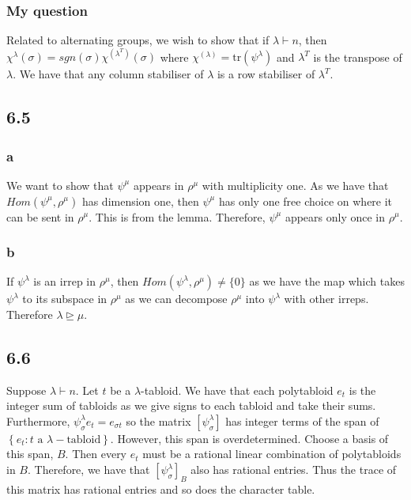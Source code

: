 \documentclass[]{article}
\newcommand{\tr}{\text{tr}}
\begin{document}
\subsubsection*{My question}
Related to alternating groups, we wish to show that if $\lambda \vdash n$, then $\chi^\lambda(\sigma) = sgn(\sigma) \chi^{(\lambda^T)}(\sigma)$ where $\chi^{(\lambda)} = \tr(\psi^\lambda)$ and $\lambda^T$ is the transpose of $\lambda$. We have that any column stabiliser of $\lambda$ is a row stabiliser of $\lambda^T$. 


\subsection*{6.5}
\subsubsection*{a}
We want to show that $\psi^\mu$ appears in $\rho^\mu$ with multiplicity one. As we have that $Hom(\psi^\mu, \rho^\mu)$ has dimension one, then $\psi^\mu$ has only one free choice on where it can be sent in $\rho^\mu$. This is from the lemma. Therefore, $\psi^\mu$ appears only once in $\rho^\mu$. 

\subsubsection*{b}
If $\psi^\lambda$ is an irrep in $\rho^\mu$, then $Hom(\psi^\lambda, \rho^\mu) \neq \{ 0 \}$ as we have the map which takes $\psi^\lambda$ to its subspace in $\rho^\mu$ as we can decompose $\rho^\mu$ into $\psi^\lambda$ with other irreps. Therefore $\lambda \unrhd  \mu$. 

\subsection*{6.6}
Suppose $\lambda \vdash n$. Let $t$ be a $\lambda$-tabloid.
We have that each polytabloid $e_t$ is the integer sum of tabloids as we give signs to each tabloid and take their sums. Furthermore, $\psi^\lambda_\sigma e_t = e_{\sigma t}$ so the matrix $\left[\psi^\lambda_\sigma\right]$ has integer terms of the span of $\left\{ e_{t}: t \text{ a } \lambda- \text{tabloid}\right\}$. However, this span is overdetermined. Choose a basis of this span, $B$. Then every $e_t$ must be a rational linear combination of polytabloids in $B$. Therefore, we have that $\left[\psi^\lambda_\sigma\right]_B$ also has rational entries. Thus the trace of this matrix has rational entries and so does the character table. 
\end{document}

